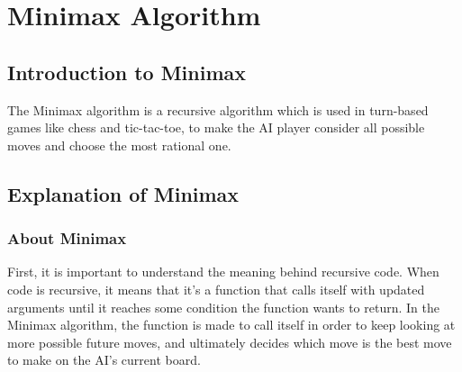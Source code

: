 \section{Minimax Algorithm} 
\label{sec:Minimax Algorithm}

\subsection{Introduction to Minimax}
\label{subsec:Introduction to Minimax}
The Minimax algorithm is a recursive algorithm which is used in turn-based games like chess and tic-tac-toe, 
to make the AI player consider all possible moves and choose the most rational one.

\subsection{Explanation of Minimax}
\label{subsec:Explanation of Minimax}
\subsubsection{About Minimax}
First, it is important to understand the meaning behind recursive code. 
When code is recursive, it means that it's a function that calls itself with updated arguments until it reaches some condition the function wants to return. 
In the Minimax algorithm, the function is made to call itself in order to keep looking at more possible future moves, 
and ultimately decides which move is the best move to make on the AI’s current board.
